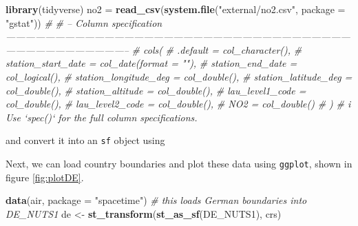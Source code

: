 \documentclass[]{book}
\newenvironment{Shaded}{\begin{snugshade}}{\end{snugshade}}
\newcommand{\CommentTok}[1]{\textcolor[rgb]{0.56,0.35,0.01}{\textit{#1}}}
\newcommand{\DataTypeTok}[1]{\textcolor[rgb]{0.13,0.29,0.53}{#1}}
\newcommand{\KeywordTok}[1]{\textcolor[rgb]{0.13,0.29,0.53}{\textbf{#1}}}
\newcommand{\NormalTok}[1]{#1}
\newcommand{\OperatorTok}[1]{\textcolor[rgb]{0.81,0.36,0.00}{\textbf{#1}}}
\newcommand{\StringTok}[1]{\textcolor[rgb]{0.31,0.60,0.02}{#1}}
\begin{document}
\begin{Shaded}
\begin{Highlighting}[]
\KeywordTok{library}\NormalTok{(tidyverse)}
\NormalTok{no2 =}\StringTok{ }\KeywordTok{read_csv}\NormalTok{(}\KeywordTok{system.file}\NormalTok{(}\StringTok{"external/no2.csv"}\NormalTok{, }\DataTypeTok{package =} \StringTok{"gstat"}\NormalTok{))}
\CommentTok{# }
\CommentTok{# -- Column specification -----------------------------------------------------------------------------------------------------------------------------------------------}
\CommentTok{# cols(}
\CommentTok{#   .default = col_character(),}
\CommentTok{#   station_start_date = col_date(format = ""),}
\CommentTok{#   station_end_date = col_logical(),}
\CommentTok{#   station_longitude_deg = col_double(),}
\CommentTok{#   station_latitude_deg = col_double(),}
\CommentTok{#   station_altitude = col_double(),}
\CommentTok{#   lau_level1_code = col_double(),}
\CommentTok{#   lau_level2_code = col_double(),}
\CommentTok{#   NO2 = col_double()}
\CommentTok{# )}
\CommentTok{# i Use `spec()` for the full column specifications.}
\end{Highlighting}
\end{Shaded}

and convert it into an \texttt{sf} object using

\begin{Shaded}
\end{Shaded}

Next, we can load country boundaries and plot these data using \texttt{ggplot}, shown
in figure \ref{fig:plotDE}.

\begin{Shaded}
\begin{Highlighting}[]
\KeywordTok{data}\NormalTok{(air, }\DataTypeTok{package =} \StringTok{"spacetime"}\NormalTok{) }\CommentTok{# this loads German boundaries into DE_NUTS1}
\NormalTok{de <-}\StringTok{ }\KeywordTok{st_transform}\NormalTok{(}\KeywordTok{st_as_sf}\NormalTok{(DE_NUTS1), crs)}
\end{Highlighting}
\end{Shaded}
\end{document}
